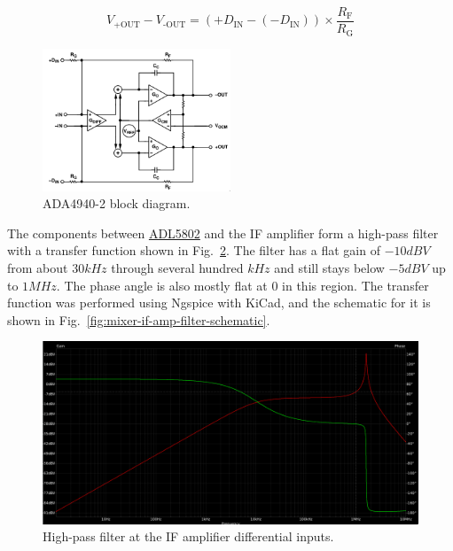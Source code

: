 \begin{equation}
        \label{eq:if-amp-gain}
        V_{\text{+OUT}} - V_{\text{-OUT}} = \left(+D_{\text{IN}} - (-D_{\text{IN}})\right) \times
        \frac{R_{\text{F}}}{R_{\text{G}}}
\end{equation}

\begin{figure}[h]
        \centering
        \includegraphics[width=0.5\textwidth]{data/ada4940-2-block}
        \caption{ADA4940-2 block diagram.}
        \label{fig:ada4940-2-block}
\end{figure}

The components between \hyperref[sec:adl5802]{ADL5802} and the IF amplifier form a high-pass filter
with a transfer function shown in Fig.~\ref{fig:mixer-if-amp-filter}. The filter has a flat gain of
$-10 \si{dBV}$ from about $30 \si{kHz}$ through several hundred $\si{kHz}$ and still stays below
$-5 \si{dBV}$ up to $1 \si{MHz}$. The phase angle is also mostly flat at 0 in this region. The
transfer function was performed using Ngspice with KiCad, and the schematic for it is shown in
Fig.~\ref{fig:mixer-if-amp-filter-schematic}.

\begin{figure}[h]
        \centering
        \includegraphics[width=\textwidth]{data/mixer-if-amp-filter}
        \caption{High-pass filter at the IF amplifier differential inputs.}
        \label{fig:mixer-if-amp-filter}
\end{figure}

